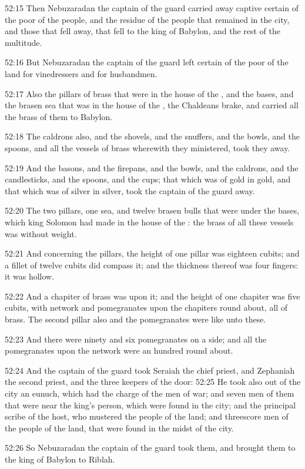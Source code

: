 52:15 Then Nebuzaradan the captain of the guard carried away captive certain of the poor of the people, and the residue of the people that remained in the city, and those that fell away, that fell to the king of Babylon, and the rest of the multitude.

52:16 But Nebuzaradan the captain of the guard left certain of the poor of the land for vinedressers and for husbandmen.

52:17 Also the pillars of brass that were in the house of the \LORD, and the bases, and the brasen sea that was in the house of the \LORD, the Chaldeans brake, and carried all the brass of them to Babylon.

52:18 The caldrons also, and the shovels, and the snuffers, and the bowls, and the spoons, and all the vessels of brass wherewith they ministered, took they away.

52:19 And the basons, and the firepans, and the bowls, and the caldrons, and the candlesticks, and the spoons, and the cups; that which was of gold in gold, and that which was of silver in silver, took the captain of the guard away.

52:20 The two pillars, one sea, and twelve brasen bulls that were under the bases, which king Solomon had made in the house of the \LORD: the brass of all these vessels was without weight.

52:21 And concerning the pillars, the height of one pillar was eighteen cubits; and a fillet of twelve cubits did compass it; and the thickness thereof was four fingers: it was hollow.

52:22 And a chapiter of brass was upon it; and the height of one chapiter was five cubits, with network and pomegranates upon the chapiters round about, all of brass. The second pillar also and the pomegranates were like unto these.

52:23 And there were ninety and six pomegranates on a side; and all the pomegranates upon the network were an hundred round about.

52:24 And the captain of the guard took Seraiah the chief priest, and Zephaniah the second priest, and the three keepers of the door: 52:25 He took also out of the city an eunuch, which had the charge of the men of war; and seven men of them that were near the king's person, which were found in the city; and the principal scribe of the host, who mustered the people of the land; and threescore men of the people of the land, that were found in the midst of the city.

52:26 So Nebuzaradan the captain of the guard took them, and brought them to the king of Babylon to Riblah.

